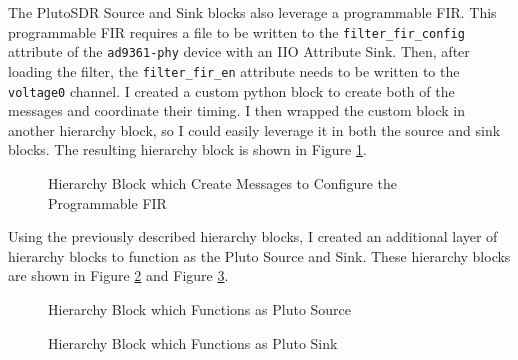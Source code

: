 \documentclass{article}
\begin{document}
The PlutoSDR Source and Sink blocks also leverage a programmable FIR. This programmable FIR requires a file to be written to the \texttt{filter\_fir\_config} attribute of the \texttt{ad9361-phy} device with an IIO Attribute Sink. Then, after loading the filter, the \texttt{filter\_fir\_en} attribute needs to be written to the \texttt{voltage0} channel. I created a custom python block to create both of the messages and coordinate their timing. I then wrapped the custom block in another hierarchy block, so I could easily leverage it in both the source and sink blocks. The resulting hierarchy block is shown in Figure \ref{fig::iio_fir_config}.

\begin{figure}[H]
	\centerline{}
	\caption{Hierarchy Block which Create Messages  to Configure the Programmable FIR}
	\label{fig::iio_fir_config}
\end{figure}

Using the previously described hierarchy blocks, I created an additional layer of hierarchy blocks to function as the Pluto Source and Sink. These hierarchy blocks are shown in Figure \ref{fig::pluto_iio_device_source} and Figure \ref{fig::pluto_iio_device_sink}.

\begin{figure}[H]
	\centerline{}
	\caption{Hierarchy Block which Functions as Pluto Source}
	\label{fig::pluto_iio_device_source}
\end{figure}

\begin{figure}[H]
	\centerline{}
	\caption{Hierarchy Block which Functions as Pluto Sink}
	\label{fig::pluto_iio_device_sink}
\end{figure}
\end{document}
